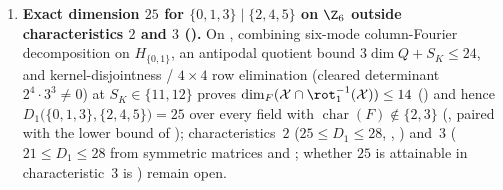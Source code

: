 \begin{enumerate}[label=\arabic*.]
  Against the optimized difference-cover bound \cite[Theorem~3.5, eq.~(6)]{SharedDecoders2026}, $c_M$
  has a strictly smaller leading coefficient if and only if $2 \le M \le 40$---improving on
  \cite[Theorem~3.5]{SharedDecoders2026} at primes $d \ne \operatorname{char}(F)$ past finite
  crossovers (from $d \ge 7$ at $M = 2$ up to $d \ge 39{,}163$ at $M = 40$) and, via
  , for composite $d \ge 35$ with $\operatorname{char}(F) \nmid d$ at $M = 2$.
  Conversely, \cite[Theorem~3.5, eq.~(6)]{SharedDecoders2026} has a $1 - \Theta(M^{-1/2})$ leading
  coefficient that is strictly smaller for every $M \ge 41$, and applies to arbitrary composite $d$
  and arbitrary field characteristic.

\item \textbf{Exact dimension $25$ for $\{0,1,3\} \mid \{2,4,5\}$ on $\Z_6$ outside characteristics $2$ and $3$ ().}
  On \cite[Problem~9.1(b)]{SeventeenthPaper2026}, combining six-mode column-Fourier decomposition on
  $H_{\{0,1\}}$, an antipodal quotient bound $3\dim Q + S_K \le 24$, and kernel-disjointness /
  $4 \times 4$ row elimination (cleared determinant $2^4 \cdot 3^3 \ne 0$) at $S_K \in \{11, 12\}$ proves
  $\dim_F(\mathcal{X} \cap \rot_1^{-1}(\mathcal{X})) \le 14$ () and
  hence $D_1\bigl(\{0,1,3\},\{2,4,5\}\bigr) = 25$ over every field with
  $\operatorname{char}(F) \notin \{2, 3\}$ (, paired with the lower bound
  of \cite[Theorem~3.2]{ClassUniformMemo2026}); characteristics~$2$ ($25 \le D_1 \le 28$,
  \cite[Theorem~6.4 and Proposition~8.2]{SeventeenthPaper2026}, \cite[Theorem~3.2]{ClassUniformMemo2026})
  and~$3$ ($21 \le D_1 \le 28$ from symmetric matrices and \cite[Theorem~6.4]{SeventeenthPaper2026};
  whether $25$ is attainable in characteristic~$3$ is \cite[Problem~6.1]{ClassUniformMemo2026}) remain
  open.


\end{enumerate}
